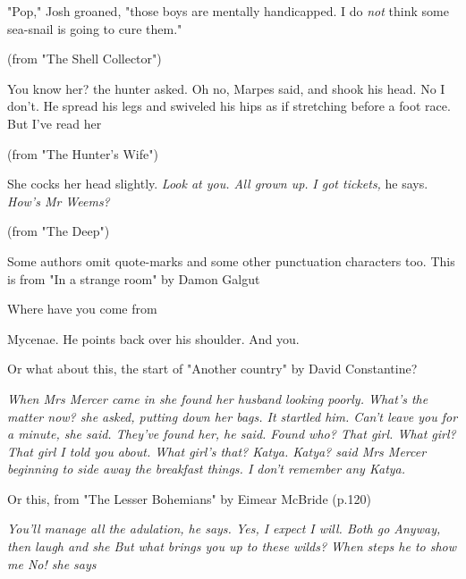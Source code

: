 \documentclass[11pt]{article}
\newenvironment{narrow}[2]{%
 \begin{list}{}{%
  \setlength{\topsep}{0pt}%
  \setlength{\leftmargin}{#1}%
  \setlength{\rightmargin}{#2}%
  \setlength{\listparindent}{\parindent}%
  \setlength{\itemindent}{\parindent}%
  \setlength{\parsep}{\parskip}%
 }%
\item[]}{\end{list}}
\begin{document}
\begin{itemize}
\item 
\begin{narrow}{1.0cm}{1.0cm}
"Pop," Josh groaned, "those boys are mentally handicapped. I do \textit{not} think some sea-snail is going to cure them."
\end{narrow}
(from "The Shell Collector")


\item 
\begin{narrow}{1.0cm}{1.0cm}
You know her? the hunter asked. Oh no, Marpes said, and shook his head. No I don't. He spread his legs and swiveled his hips as if stretching before a foot race. But I've read her
\end{narrow}
(from "The Hunter's Wife")


\item 
\begin{narrow}{1.0cm}{1.0cm}
She cocks her head slightly. \textit{Look at you. All grown up.}
\textit{I got tickets,} he says.
\textit{How's Mr Weems?}
\end{narrow}
(from "The Deep")
\end{itemize}
Some authors omit quote-marks and some other punctuation characters too. This is from "In a strange room" by Damon Galgut

\begin{narrow}{1.0cm}{1.0cm}
Where have you come from

Mycenae. He points back over his shoulder. And you.
\end{narrow}
Or what about this, the start of "Another country" by David Constantine?

\begin{narrow}{1.0cm}{1.0cm}
 \textit{When Mrs Mercer came in she found her husband looking poorly. What's the 
matter now? she asked, putting down her bags. It startled him. Can't leave 
you for a minute, she said. They've found her, he said. Found who? That 
girl. What girl? That girl I told you about. What girl's that? Katya. Katya? 
said Mrs Mercer beginning to side away the breakfast things. I don't remember 
any Katya.}
\end{narrow}
Or this, from "The Lesser Bohemians" by Eimear McBride (p.120)

\begin{narrow}{1.0cm}{1.0cm}
 \textit{You'll manage all the adulation, he says. Yes, I expect I will. Both go 
Anyway, then laugh and she But what brings you up to these wilds? When steps 
he to show me No! she says}
\end{narrow}
\end{document}
